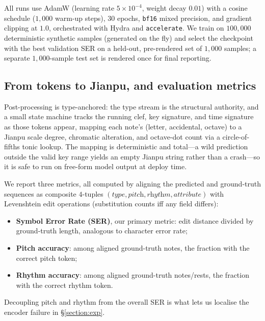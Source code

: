 All runs use AdamW (learning rate $5\times10^{-4}$, weight decay $0.01$) with a
cosine schedule ($1{,}000$ warm-up steps), $30$ epochs, \texttt{bf16} mixed
precision, and gradient clipping at $1.0$, orchestrated with Hydra and
\texttt{accelerate}. We train on $100{,}000$ deterministic synthetic samples
(generated on the fly) and select the checkpoint with the best validation SER on
a held-out, pre-rendered set of $1{,}000$ samples; a separate $1{,}000$-sample
test set is rendered once for final reporting.

\subsection{From tokens to Jianpu, and evaluation metrics}
\label{sec:method:eval}

Post-processing is type-anchored: the type stream is the structural authority,
and a small state machine tracks the running clef, key signature, and time
signature as those tokens appear, mapping each note's (letter, accidental,
octave) to a Jianpu scale degree, chromatic alteration, and octave-dot count via a
circle-of-fifths tonic lookup. The mapping is deterministic and total---a wild
prediction outside the valid key range yields an empty Jianpu string rather than
a crash---so it is safe to run on free-form model output at deploy time.

We report three metrics, all computed by aligning the predicted and
ground-truth sequences as composite $4$-tuples $(\textit{type},\textit{pitch},%
\textit{rhythm},\textit{attribute})$ with Levenshtein edit operations
(substitution counts iff any field differs):
\begin{itemize}
    \item \textbf{Symbol Error Rate (SER)}, our primary metric: edit distance
    divided by ground-truth length, analogous to character error rate;
    \item \textbf{Pitch accuracy}: among aligned ground-truth notes, the fraction
    with the correct pitch token;
    \item \textbf{Rhythm accuracy}: among aligned ground-truth notes/rests, the
    fraction with the correct rhythm token.
\end{itemize}
Decoupling pitch and rhythm from the overall SER is what lets us localise the
encoder failure in \S\ref{section:exp}.

